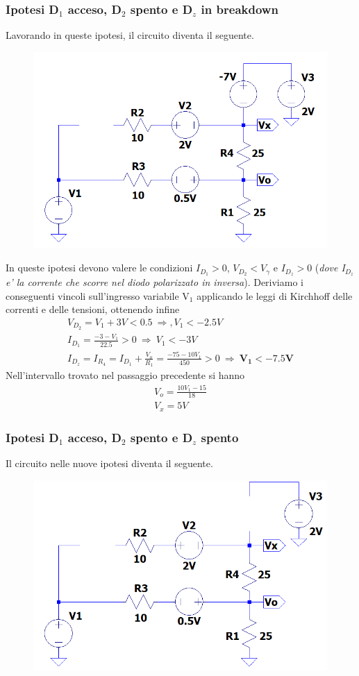 \documentclass[a4paper,10pt]{article}
\begin{document}
\newpage

\subsubsection{Ipotesi D$_1$ acceso, D$_2$ spento e D$_z$ in breakdown}
Lavorando in queste ipotesi, il circuito diventa il seguente. \newline
\begin{figure}[h!]
  	\centering
 	\includegraphics[width=0.3\linewidth]{es1-1-4.png}
\end{figure}

\noindent In queste ipotesi devono valere le condizioni $I_{D_1}>0$, $V_{D_2}<V_{\gamma}$ e $I_{D_z}>0$ (\textit{dove I$_{D_z}$ e' la corrente che scorre nel diodo polarizzato in inversa}). Deriviamo i conseguenti vincoli sull'ingresso variabile V$_1$ applicando le leggi di Kirchhoff delle correnti e delle tensioni, ottenendo infine
	\begin{gather*}
		V_{D_2} = V_1 + 3V < 0.5 \ \Rightarrow , V_1 < -2.5V \\
		I_{D_1} = \frac{-3 - V_1}{22.5}>0 \ \Rightarrow \ V_{1} < -3V \\
		I_{D_z} = I_{R_4} = I_{D_1}+\frac{V_o}{R_1} = \frac{-75 - 10V_1}{450} > 0 \ \Rightarrow \ \mathbf{V_1 < -7.5V}
	\end{gather*}
Nell'intervallo trovato nel passaggio precedente si hanno
	\begin{gather*}
		V_o = \frac{10V_1 - 15}{18} \\
		V_x = 5V
	\end{gather*}

\subsubsection{Ipotesi D$_1$ acceso, D$_2$ spento e D$_z$ spento}
Il circuito nelle nuove ipotesi diventa il seguente. \newline
\begin{figure}[h!]
  	\centering
 	\includegraphics[width=0.3\linewidth]{es1-1-5.png}
\end{figure}
\end{document}
